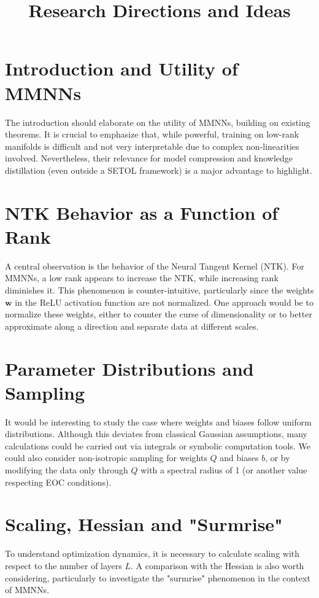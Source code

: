 \documentclass{article}
\title{Research Directions and Ideas}
\author{}
\date{}
\begin{document}
\maketitle

\section{Introduction and Utility of MMNNs}
The introduction should elaborate on the utility of MMNNs, building on existing theorems. It is crucial to emphasize that, while powerful, training on low-rank manifolds is difficult and not very interpretable due to complex non-linearities involved. Nevertheless, their relevance for model compression and knowledge distillation (even outside a SETOL framework) is a major advantage to highlight.

\section{NTK Behavior as a Function of Rank}
A central observation is the behavior of the Neural Tangent Kernel (NTK). For MMNNs, a low rank appears to increase the NTK, while increasing rank diminishes it. This phenomenon is counter-intuitive, particularly since the weights $\bm{w}$ in the ReLU activation function are not normalized. One approach would be to normalize these weights, either to counter the curse of dimensionality or to better approximate along a direction and separate data at different scales.

\section{Parameter Distributions and Sampling}
It would be interesting to study the case where weights and biases follow uniform distributions. Although this deviates from classical Gaussian assumptions, many calculations could be carried out via integrals or symbolic computation tools. We could also consider non-isotropic sampling for weights $Q$ and biases $b$, or by modifying the data only through $Q$ with a spectral radius of 1 (or another value respecting EOC conditions).

\section{Scaling, Hessian and "Surmrise"}
To understand optimization dynamics, it is necessary to calculate scaling with respect to the number of layers $L$. A comparison with the Hessian is also worth considering, particularly to investigate the "surmrise" phenomenon in the context of MMNNs.
\end{document}
